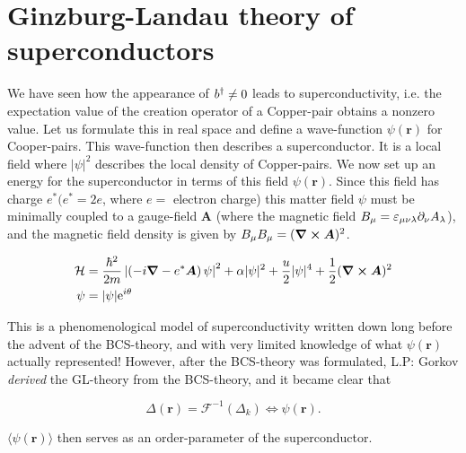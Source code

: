 \section[Ginzburg-Landau]{Ginzburg-Landau theory of superconductors}

We have seen how the appearance of $b^{\dagger} \neq 0$ leads to superconductivity, i.e. the expectation value of the creation operator of a Copper-pair obtains a nonzero value. Let us formulate this in real space and define a wave-function $\psi(\bm{r}) $ for Cooper-pairs. This wave-function then describes a superconductor. It is a local field where $|\psi|^2$ describes the local density of Copper-pairs. We now set up an energy for the superconductor in terms of this field $\psi(\bm{r})$. Since this field has charge $e^* (e^* = 2e$, where $e =$ electron charge) this matter field $\psi$ must be minimally coupled to a gauge-field $\bm{A}$ (where the magnetic field $B_\mu = \varepsilon_{\mu\nu\lambda} \partial_\nu A_\lambda$), and the magnetic field density is given by $B_\mu B_\mu = (\grad \cross \bm{A} )^2$.


\begin{equation}
\begin{aligned}
\mathcal{H}  &= \frac{\hbar^2}{2m} \left |\left (-i\grad - e^*\bm{A}\right )\psi \right |^2 + \alpha |\psi|^2 + \frac{u}{2} |\psi|^4 + \frac{1}{2}(\grad \cross \bm{A} )^2 \\
\psi &= |\psi| \mathrm{e}^{i\theta}
\label{Ham_ginz_lan}
\end{aligned}
\end{equation}

This is a phenomenological model of superconductivity written down long before the advent of the BCS-theory, and with very limited knowledge of what $\psi(\bm{r})$ actually represented! However, after the BCS-theory was formulated, L.P: Gorkov \emph{derived} the GL-theory from the BCS-theory, and it became clear that

\begin{equation}
\Delta (\bm{r}) = \mathcal{F}^{-1}(\Delta_k) \iff \psi(\bm{r}).
\label{gap_fourrier}
\end{equation}

$\langle \psi(\bm{r}) \rangle$ then serves as an order-parameter of the superconductor.

